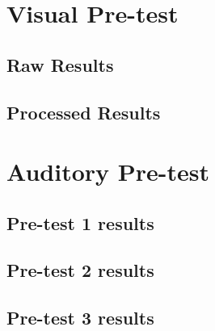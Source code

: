 
\appendix
\appendixpage
\addappheadtotoc
\noappendicestocpagenum

\section{Visual Pre-test} \label{sec:visual_pre_test_raw_results}
\subsection{Raw Results} %
\label{sub:raw_results}




\subsection{Processed Results} %
\label{sub:processed_results}





\section{Auditory Pre-test} %
\label{sec:auditory_pre_test}
\subsection{Pre-test 1 results} %
\label{sub:pre_test_1_results}


\subsection{Pre-test 2 results} %
\label{sub:pre_test_2_results}


\subsection{Pre-test 3 results} %
\label{sub:pre_test_3_results}



